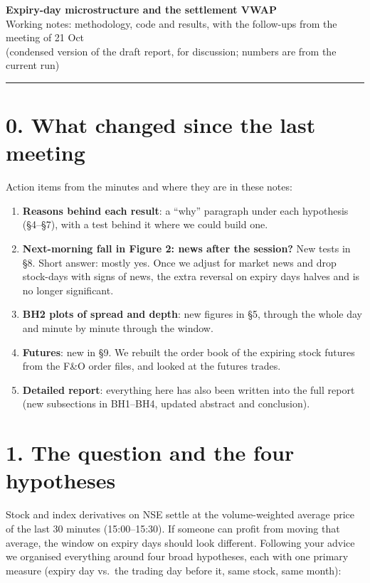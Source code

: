 \documentclass[11pt]{article}
\begin{document}
{\large\textbf{Expiry-day microstructure and the settlement VWAP}}\\
Working notes: methodology, code and results, with the follow-ups from the meeting of 21 Oct\\
\small{(condensed version of the draft report, for discussion; numbers are from the current run)}
\normalsize

\hrule
\vspace{1em}

\section*{0. What changed since the last meeting}

Action items from the minutes and where they are in these notes:
\begin{enumerate}
  \item \textbf{Reasons behind each result}: a ``why'' paragraph under each hypothesis
  (\S4--\S7), with a test behind it where we could build one.
  \item \textbf{Next-morning fall in Figure 2: news after the session?} New tests in \S8. Short
  answer: mostly yes. Once we adjust for market news and drop stock-days with signs of news,
  the extra reversal on expiry days halves and is no longer significant.
  \item \textbf{BH2 plots of spread and depth}: new figures in \S5, through the whole day and
  minute by minute through the window.
  \item \textbf{Futures}: new in \S9. We rebuilt the order book of the expiring stock futures
  from the F\&O order files, and looked at the futures trades.
  \item \textbf{Detailed report}: everything here has also been written into the full report
  (new subsections in BH1--BH4, updated abstract and conclusion).
\end{enumerate}

\section*{1. The question and the four hypotheses}

Stock and index derivatives on NSE settle at the volume-weighted average price of the last
30 minutes (15:00--15:30). If someone can profit from moving that average, the window on expiry
days should look different. Following your advice we organised everything around four broad
hypotheses, each with one primary measure (expiry day vs.\ the trading day before it, same
stock, same month):
\end{document}
